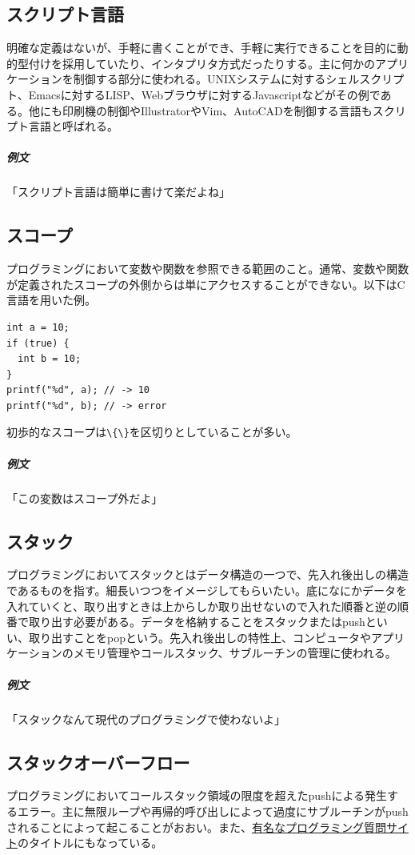 \documentclass[dvipdfmx,jb5]{jreport}
\newcommand{\link}[2]{\href{#2}{#1}}
\newcommand{\terlogy}[2][|]{\colorbox{terlogy}{\texttt{\lstinline#1#2#1}}}
\begin{document}
\subsection{スクリプト言語}
明確な定義はないが、手軽に書くことができ、手軽に実行できることを目的に動的型付けを採用していたり、インタプリタ方式だったりする。主に何かのアプリケーションを制御する部分に使われる。UNIXシステムに対するシェルスクリプト、Emacsに対するLISP、Webブラウザに対するJavascriptなどがその例である。他にも印刷機の制御やIllustratorやVim、AutoCADを制御する言語もスクリプト言語と呼ばれる。

\subparagraph{例文}「スクリプト言語は簡単に書けて楽だよね」

\subsection{スコープ}
プログラミングにおいて変数や関数を参照できる範囲のこと。通常、変数や関数が定義されたスコープの外側からは単にアクセスすることができない。以下はC言語を用いた例。

\lstset{language=C}
\begin{lstlisting}
int a = 10;
if (true) {
  int b = 10;
}
printf("%d", a); // -> 10
printf("%d", b); // -> error
\end{lstlisting}

初歩的なスコープは\terlogy{\{\}}を区切りとしていることが多い。

\subparagraph{例文}「この変数はスコープ外だよ」

\subsection{スタック}
プログラミングにおいてスタックとはデータ構造の一つで、先入れ後出しの構造であるものを指す。細長いつつをイメージしてもらいたい。底になにかデータを入れていくと、取り出すときは上からしか取り出せないので入れた順番と逆の順番で取り出す必要がある。データを格納することをスタックまたはpushといい、取り出すことをpopという。先入れ後出しの特性上、コンピュータやアプリケーションのメモリ管理やコールスタック、サブルーチンの管理に使われる。

\subparagraph{例文}「スタックなんて現代のプログラミングで使わないよ」

\subsection{スタックオーバーフロー}
プログラミングにおいてコールスタック領域の限度を超えたpushによる発生するエラー。主に無限ループや再帰的呼び出しによって過度にサブルーチンがpushされることによって起こることがおおい。また、\link{有名なプログラミング質問サイト}{https://ja.stackoverflow.com/}のタイトルにもなっている。
\end{document}
